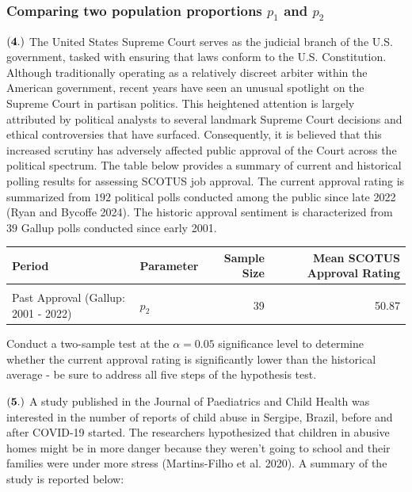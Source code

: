 \documentclass[
]{article}
\begin{document}
\subsubsection{\texorpdfstring{Comparing two population proportions
\(p_1\) and
\(p_2\)}{Comparing two population proportions p\_1 and p\_2}}\label{comparing-two-population-proportions-p_1-and-p_2}

\(\bf (4.)\) The United States Supreme Court serves as the judicial
branch of the U.S. government, tasked with ensuring that laws conform to
the U.S. Constitution. Although traditionally operating as a relatively
discreet arbiter within the American government, recent years have seen
an unusual spotlight on the Supreme Court in partisan politics. This
heightened attention is largely attributed by political analysts to
several landmark Supreme Court decisions and ethical controversies that
have surfaced. Consequently, it is believed that this increased scrutiny
has adversely affected public approval of the Court across the political
spectrum. The table below provides a summary of current and historical
polling results for assessing SCOTUS job approval. The current approval
rating is summarized from \(192\) political polls conducted among the
public since late 2022 (Ryan and Bycoffe 2024). The historic approval
sentiment is characterized from \(39\) Gallup polls conducted since
early 2001.

\begin{table}[H]
\centering\centering
\begin{tabular}{llrr}
\toprule
Period & Parameter & Sample Size & Mean SCOTUS Approval Rating\\
\midrule
\cellcolor{gray!10}{Current Approval (2022 - 2024)} & \cellcolor{gray!10}{$p_1$} & \cellcolor{gray!10}{192} & \cellcolor{gray!10}{41.16}\\
Past Approval (Gallup: 2001 - 2022) & $p_2$ & 39 & 50.87\\
\bottomrule
\end{tabular}
\end{table}

Conduct a two-sample test at the \(\alpha = 0.05\) significance level to
determine whether the current approval rating is significantly lower
than the historical average - be sure to address all five steps of the
hypothesis test.

\(\bf (5.)\) A study published in the Journal of Paediatrics and Child
Health was interested in the number of reports of child abuse in
Sergipe, Brazil, before and after COVID-19 started. The researchers
hypothesized that children in abusive homes might be in more danger
because they weren't going to school and their families were under more
stress (Martins-Filho et al. 2020). A summary of the study is reported
below:
\end{document}

